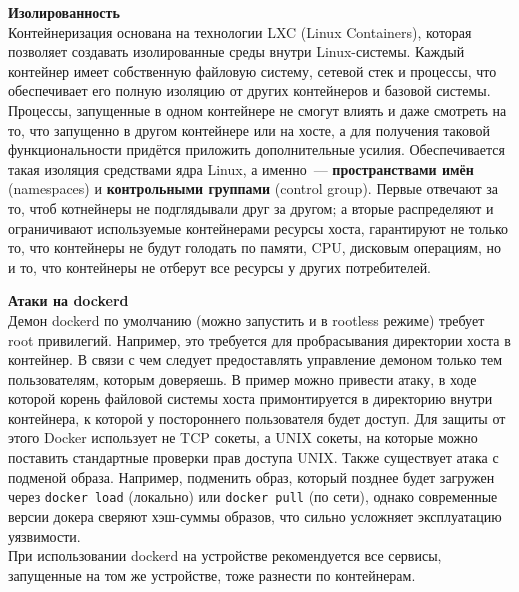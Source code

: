     \textbf{Изолированность} ~\\
	Контейнеризация основана на технологии LXC (Linux Containers), 
	которая позволяет создавать изолированные среды внутри Linux-системы. 
	Каждый контейнер имеет собственную файловую систему, сетевой стек 
	и процессы, что обеспечивает его полную изоляцию от других контейнеров 
	и базовой системы. Процессы, запущенные в одном контейнере не смогут влиять и даже смотреть на то, что запущенно в другом контейнере или на хосте, а для получения таковой функциональности придётся приложить дополнительные усилия. 
    Обеспечивается такая изоляция средствами ядра Linux, а именно~--- \textbf{пространствами имён} (namespaces) и \textbf{контрольными группами} (control group). Первые отвечают за то, чтоб котнейнеры
    не подглядывали друг за другом; а вторые распределяют и ограничивают используемые контейнерами ресурсы хоста, гарантируют не только то, что контейнеры не будут голодать по памяти, CPU, дисковым операциям,
    но и то, что контейнеры не отберут все ресурсы у других потребителей.

    \textbf{Атаки на dockerd} ~\\
    Демон dockerd по умолчанию (можно запустить и в rootless режиме) требует root привилегий. Например, это требуется для пробрасывания директории хоста в контейнер. В связи с чем следует предоставлять
    управление демоном только тем пользователям, которым доверяешь. В пример можно привести атаку, в ходе которой корень файловой системы хоста примонтируется в директорию внутри контейнера, к которой
    у постороннего пользователя будет доступ. Для защиты от этого Docker использует не TCP сокеты, а UNIX сокеты, на которые можно поставить стандартные проверки прав доступа UNIX.
    Также существует атака с подменой образа. Например, подменить образ, который позднее будет загружен через \texttt{docker load} (локально) или \texttt{docker pull} (по сети), однако современные версии докера
    сверяют хэш-суммы образов, что сильно усложняет эксплуатацию уязвимости. \autocite{DockerSecurity} ~\\
    При использовании dockerd на устройстве рекомендуется все сервисы, запущенные на том же устройстве, тоже разнести по контейнерам.

